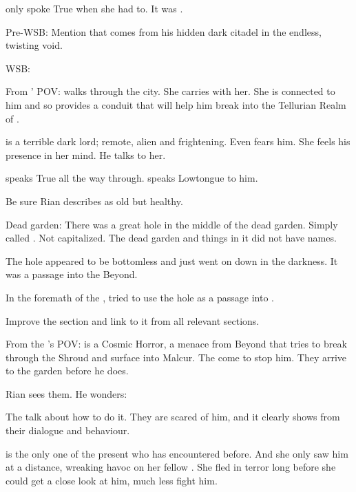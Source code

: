 \Criseis only spoke True \Draconic when she had to.
It was . 


Pre-WSB: 
  Mention that \Ishnaruchaefir comes from his hidden dark citadel in the endless, twisting void. 


WSB:
  
  From \Criseis' POV: 
    \Criseis walks through the city.
    She carries \Ishnaruchaefir with her.
    She is connected to him and so provides a conduit that will help him break into the Tellurian Realm of \Azmith. 
    
    \Ishnaruchaefir is a terrible dark lord; remote, alien and frightening. 
    Even \Criseis fears him. 
    She feels his presence in her mind.
    He talks to her. 
    
    \Ishnaruchaefir speaks True \Draconic all the way through.
    \Criseis speaks Lowtongue to him.
    
    Be sure Rian describes \Criseis as old but healthy. 
  
  Dead garden: 
    There was a great hole in the middle of the dead garden.
    Simply called . 
    Not capitalized. 
    The dead garden and things in it did not have names. 
    
    The hole appeared to be bottomless and just went on down in the darkness. 
    It was a passage into the Beyond. 
    
    In the foremath of the \thirdbanewar, \Ishnaruchaefir tried to use the hole as a passage into \Azmith. 
    
    Improve the  section and link to it from all relevant sections. 
  
  From the \resphain's POV:
    \Ishnaruchaefir is a Cosmic Horror, a menace from Beyond that tries to break through the Shroud and surface into Malcur.
    The \resphain come to stop him. 
    They arrive to the garden before he does. 
    
    Rian sees them. 
    He wonders:
    
    The \resphain talk about how to do it. 
    They are scared of him, and it clearly shows from their dialogue and behaviour. 
    
    \Achsah is the only one of the \resphain present who has encountered \Ishnaruchaefir before. 
    And she only saw him at a distance, wreaking havoc on her fellow \resphain.
    She fled in terror long before she could get a close look at him, much less fight him. 
    
